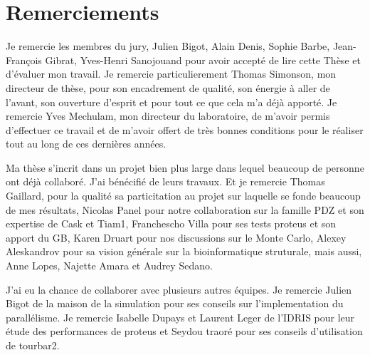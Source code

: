 \chapter*{Remerciements}

Je remercie les membres du jury, Julien Bigot, Alain Denis, Sophie Barbe, Jean-François Gibrat, Yves-Henri Sanojouand pour avoir accepté de lire cette Thèse et d'évaluer mon travail. Je remercie particulierement Thomas Simonson, mon directeur de thèse, pour son encadrement de qualité, son énergie à aller de l'avant, son ouverture d'esprit et pour tout ce que cela m'a déjà apporté. Je remercie Yves Mechulam, mon directeur du laboratoire, de m'avoir permis d'effectuer ce travail et de m'avoir offert de très bonnes conditions pour le réaliser tout au long de ces dernières années.

Ma thèse s'incrit dans un projet bien plus large dans lequel beaucoup de personne ont déjà collaboré. J'ai bénécifié de leurs travaux. Et je remercie Thomas Gaillard, pour la qualité sa particitation au projet sur laquelle se fonde beaucoup de mes résultats, Nicolas Panel pour notre collaboration sur la famille PDZ et son expertise de Cask et Tiam1, Franchescho Villa pour ses tests proteus et son apport du GB, Karen Druart pour nos discussions sur le Monte Carlo, Alexey Aleskandrov pour sa vision générale sur la bioinformatique struturale, mais aussi, Anne Lopes, Najette Amara et Audrey Sedano.

J'ai eu la chance de collaborer avec plusieurs autres équipes. Je remercie Julien Bigot de la maison de la simulation pour ses conseils sur l'implementation du parallélisme. Je remercie Isabelle Dupays et Laurent Leger de l'IDRIS pour leur étude des performances de proteus et Seydou traoré pour ses conseils d'utilisation de tourbar2. 


